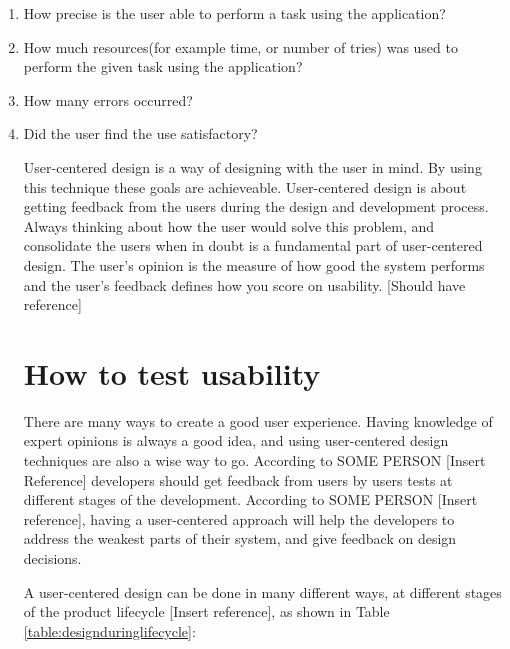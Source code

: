 \begin{enumerate}
\item{How precise is the user able to perform a task using the application?}
\item{How much resources(for example time, or number of tries) was used to perform the given task using the application?}
\item{How many errors occurred?}
\item{Did the user find the use satisfactory?}

User-centered design is a way of designing with the user in mind. By using this technique these goals are achieveable. User-centered design is about getting feedback from the users during the design and development process. Always thinking about how the user would solve this problem, and consolidate the users when in doubt is a fundamental part of user-centered design. The user's opinion is the measure of how good the system performs and the user's feedback defines how you score on usability. [Should have reference]

\section{How to test usability}
There are many ways to create a good user experience. Having knowledge of expert opinions is always a good idea, and using user-centered design techniques are also a wise way to go. According to SOME PERSON [Insert Reference] developers should get feedback from users by users tests at different stages of the development. According to SOME PERSON [Insert reference], having a user-centered approach will help the developers to address the weakest parts of their system, and give feedback on design decisions. 

A user-centered design can be done in many different ways, at different stages of the product lifecycle [Insert reference], as shown in Table \ref{table:designduringlifecycle}:


\end{enumerate}

